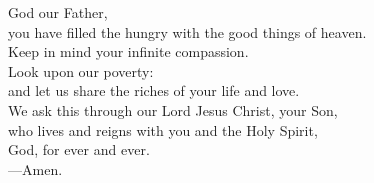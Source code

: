 \prayer


\begin{prayerverse}
God our Father,\\
you have filled the hungry with the good things of heaven.\\
Keep in mind your infinite compassion.\\
Look upon our poverty:\\
and let us share the riches of your life and love.\\
We ask this through our Lord Jesus Christ, your Son,\\
who lives and reigns with you and the Holy Spirit,\\
God, for ever and ever.\\
{\color{red}---\thinspace}Amen.
\end{prayerverse}

